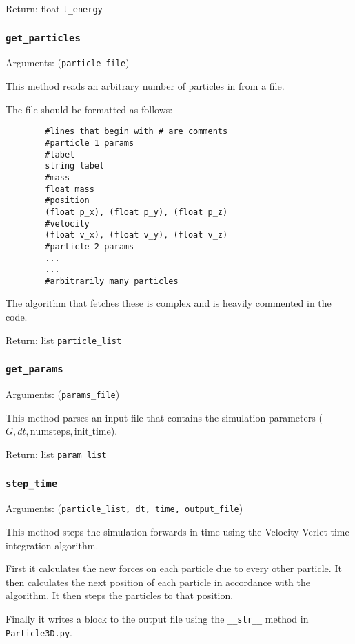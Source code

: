 \documentclass[a4paper, 11pt, british, left=1in, right=1in, top=0.3in, bottom=1in]{article}
\begin{document}
	Return: float \texttt{t\_energy}
	
	\subsubsection{\texttt{get\_particles}}
	
	Arguments: (\texttt{particle\_file})
	
	This method reads an arbitrary number of particles in from a file. 
	
	The file should be formatted as follows:
	\pagebreak
	\begin{verbatim}
		#lines that begin with # are comments
		#particle 1 params
		#label
		string label
		#mass
		float mass
		#position
		(float p_x), (float p_y), (float p_z)
		#velocity
		(float v_x), (float v_y), (float v_z)
		#particle 2 params
		...
		...
		#arbitrarily many particles
	\end{verbatim}
	
	The algorithm that fetches these is complex and is heavily commented in the code. 
	
	Return: list \texttt{particle\_list}
	
	\subsubsection{\texttt{get\_params}}
	
	Arguments: (\texttt{params\_file})
	
	This method parses an input file that contains the simulation parameters ($G, dt, \text{numsteps}, \text{init\_time}$).
	
	
	Return: list \texttt{param\_list}
	
	\subsubsection{\texttt{step\_time}}
	
	Arguments: (\texttt{particle\_list, dt, time, output\_file})
	
	This method steps the simulation forwards in time using the Velocity Verlet time integration algorithm. 
	
	First it calculates the new forces on each particle due to every other particle. It then calculates the next position of each particle in accordance with the algorithm. It then steps the particles to that position. 
	
	Finally it writes a block to the output file using the \texttt{\_\_str\_\_} method in \texttt{Particle3D.py}.
	
\end{document}
